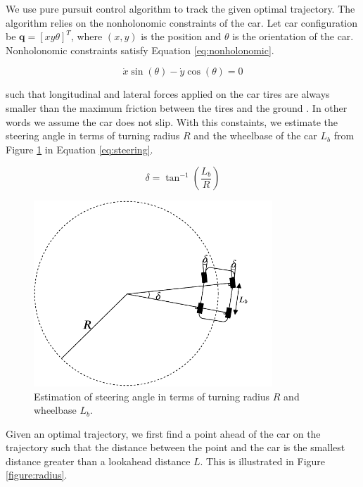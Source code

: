 We use pure pursuit control algorithm to track the given optimal trajectory.
The algorithm relies on the nonholonomic constraints of the car. Let car
configuration be $\textbf{q} = [x y \theta]^T$, where $(x, y)$ is the position
and $\theta$ is the orientation of the car. Nonholonomic constraints satisfy
Equation \eqref{eq:nonholonomic}.

\begin{equation}
  \dot{x}\sin(\theta) - \dot{y}\cos(\theta) = 0
  \label{eq:nonholonomic}
\end{equation}

such that longitudinal and lateral forces applied on the car tires are always
smaller than the maximum friction between the tires and the ground
\cite{Kim2013SensorbasedMP}.  In other words we assume the car does not slip.
With this constaints, we estimate the steering angle in terms of turning radius
$R$ and the wheelbase of the car $L_b$ from Figure \ref{figure:steering} in
Equation \eqref{eq:steering}.

\begin{equation}
  \delta = \tan^{-1}(\frac{L_b}{R})
  \label{eq:steering}
\end{equation}

\begin{figure}[h]
  \centering
  \includegraphics[width=0.8\textwidth]{figures/pure-pursuit-steering.pdf}
  \caption{Estimation of steering angle in terms of turning radius $R$ and
  wheelbase $L_b$.}
  \label{figure:steering}
\end{figure}

Given an optimal trajectory, we first find a point ahead of the car on the
trajectory such that the distance between the point and the car is the smallest
distance greater than a lookahead distance $L$. This is illustrated in Figure
\ref{figure:radius}.

